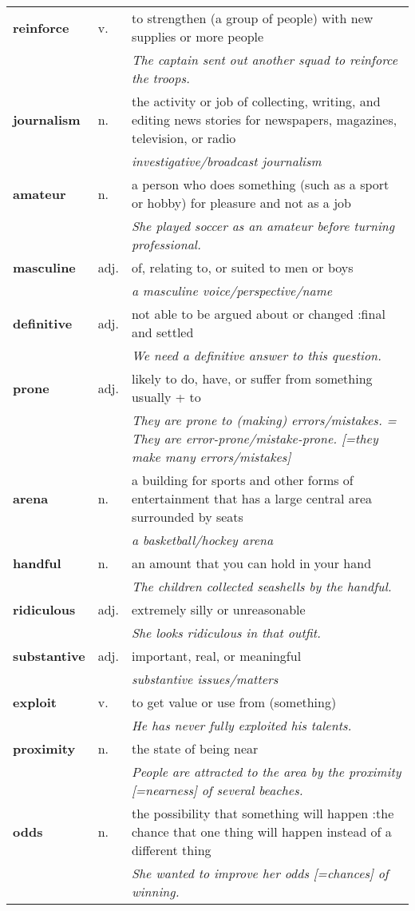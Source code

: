 \documentclass[a4paper]{article}
\begin{document}
\begin{longtable}{llp{11cm}}
\textbf{reinforce} & v. &  to strengthen (a group of people) with new supplies or more people \\
 & & \textit{The captain sent out another squad to reinforce the troops.}\\[0.08cm]
\textbf{journalism} & n. &  the activity or job of collecting, writing, and editing news stories for newspapers, magazines, television, or radio \\
 & & \textit{investigative/broadcast journalism}\\[0.08cm]
\textbf{amateur} & n. &  a person who does something (such as a sport or hobby) for pleasure and not as a job \\
 & & \textit{She played soccer as an amateur before turning professional.}\\[0.08cm]
\textbf{masculine} & adj. &  of, relating to, or suited to men or boys \\
 & & \textit{a masculine voice/perspective/name}\\[0.08cm]
\textbf{definitive} & adj. &  not able to be argued about or changed :final and settled \\
 & & \textit{We need a definitive answer to this question.}\\[0.08cm]
\textbf{prone} & adj. &  likely to do, have, or suffer from something usually + to \\
 & & \textit{They are prone to (making) errors/mistakes. = They are error-prone/mistake-prone. [=they make many errors/mistakes]}\\[0.08cm]
\textbf{arena} & n. &  a building for sports and other forms of entertainment that has a large central area surrounded by seats \\
 & & \textit{a basketball/hockey arena}\\[0.08cm]
\textbf{handful} & n. &  an amount that you can hold in your hand \\
 & & \textit{The children collected seashells by the handful.}\\[0.08cm]
\textbf{ridiculous} & adj. &  extremely silly or unreasonable \\
 & & \textit{She looks ridiculous in that outfit.}\\[0.08cm]
\textbf{substantive} & adj. &  important, real, or meaningful \\
 & & \textit{substantive issues/matters}\\[0.08cm]
\textbf{exploit} & v. &  to get value or use from (something) \\
 & & \textit{He has never fully exploited his talents.}\\[0.08cm]
\textbf{proximity} & n. &  the state of being near \\
 & & \textit{People are attracted to the area by the proximity [=nearness] of several beaches.}\\[0.08cm]
\textbf{odds} & n. &  the possibility that something will happen :the chance that one thing will happen instead of a different thing \\
 & & \textit{She wanted to improve her odds [=chances] of winning.}\\[0.08cm]
\end{longtable}
\end{document}
